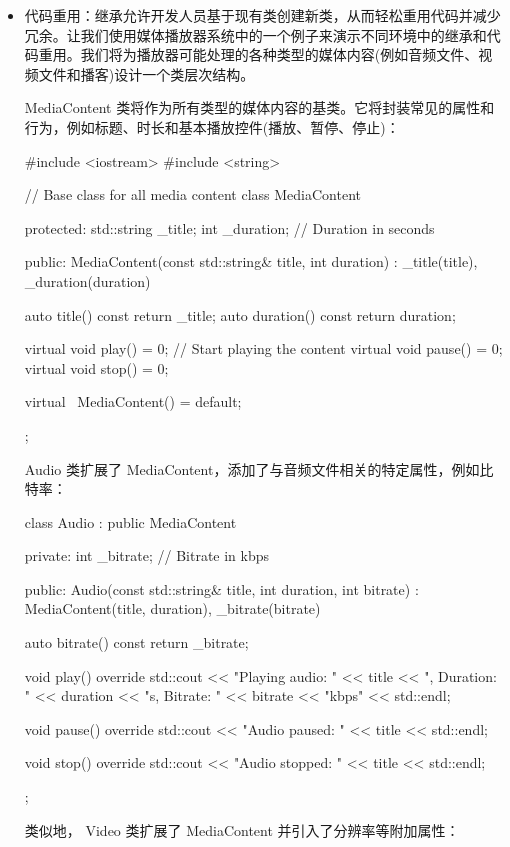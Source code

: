\begin{itemize}
\item
代码重用：继承允许开发人员基于现有类创建新类，从而轻松重用代码并减少冗余。让我们使用媒体播放器系统中的一个例子来演示不同环境中的继承和代码重用。我们将为播放器可能处理的各种类型的媒体内容(例如音频文件、视频文件和播客)设计一个类层次结构。

MediaContent 类将作为所有类型的媒体内容的基类。它将封装常见的属性和行为，例如标题、时长和基本播放控件(播放、暂停、停止)：

\begin{cpp}
#include <iostream>
#include <string>

// Base class for all media content
class MediaContent {
protected:
    std::string _title;
    int _duration; // Duration in seconds

public:
    MediaContent(const std::string& title, int duration)
        : _title(title), _duration(duration) {}

    auto title() const { return _title; }
    auto duration() const { return duration; }

    virtual void play() = 0; // Start playing the content
    virtual void pause() = 0;
    virtual void stop() = 0;

    virtual ~MediaContent() = default;
};
\end{cpp}

Audio 类扩展了 MediaContent，添加了与音频文件相关的特定属性，例如比特率：

\begin{cpp}
class Audio : public MediaContent {
private:
    int _bitrate; // Bitrate in kbps

public:
    Audio(const std::string& title, int duration, int bitrate)
        : MediaContent(title, duration), _bitrate(bitrate) {}

    auto bitrate() const { return _bitrate; }

    void play() override {
        std::cout << "Playing audio: " << title << ", Duration: " << duration << "s, Bitrate: " << bitrate << "kbps" << std::endl;
    }

    void pause() override {
        std::cout << "Audio paused: " << title << std::endl;
    }

    void stop() override {
        std::cout << "Audio stopped: " << title << std::endl;
    }
};
\end{cpp}

类似地， Video 类扩展了 MediaContent 并引入了分辨率等附加属性：


\end{itemize}
